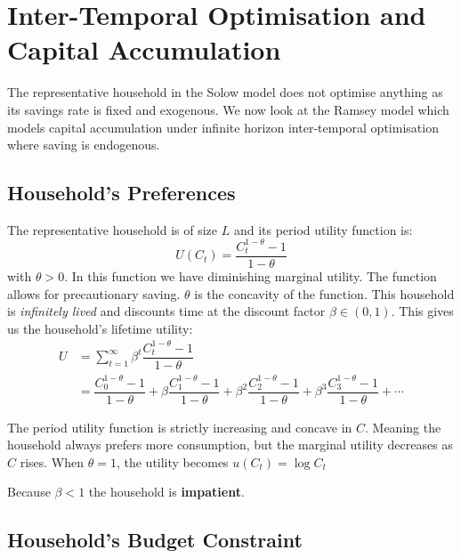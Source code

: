 \documentclass[11pt]{article}
\begin{document}
\section{Inter-Temporal Optimisation and Capital Accumulation}

The representative household in the Solow model does not optimise anything as its savings rate is fixed and exogenous. We now look at the Ramsey model which models capital accumulation under infinite horizon inter-temporal optimisation where saving is endogenous.

\subsection{Household's Preferences}

The representative household is of size $L$ and its period utility function is:
\[U(C_t) = \dfrac{C_t^{1-\theta}-1}{1-\theta}\]
with $\theta>0$. In this function we have diminishing marginal utility. The function allows for precautionary saving. $\theta$ is the concavity of the function. This household is \textit{infinitely lived} and discounts time at the discount factor $\beta \in (0,1)$. This gives us the household's lifetime utility:
\begin{equation}
\label{household utility}
    \begin{aligned}
        U &= \sum_{t=1}^\infty \beta^t \dfrac{C_t^{1-\theta}-1}{1-\theta} \\
        &= \dfrac{C_0^{1-\theta}-1}{1-\theta} + \beta \dfrac{C_1^{1-\theta}-1}{1-\theta} + \beta^2 \dfrac{C_2^{1-\theta}-1}{1-\theta} + \beta^3 \dfrac{C_3^{1-\theta}-1}{1-\theta} + \cdots
    \end{aligned}
\end{equation}

\begin{note}
    The period utility function is strictly increasing and concave in $C$. Meaning the household always prefers more consumption, but the marginal utility decreases as $C$ rises. When $\theta=1$, the utility becomes $u(C_t) = \log C_t$
\end{note}

\begin{note}
    Because $\beta<1$ the household is \textbf{impatient}.
\end{note}

\subsection{Household's Budget Constraint}
\end{document}
